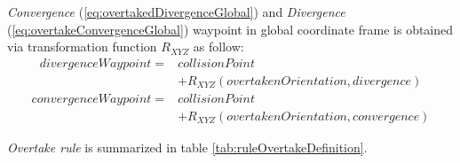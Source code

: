 \emph{Convergence} (\ref{eq:overtakedDivergenceGlobal}) and \emph{Divergence} (\ref{eq:overtakeConvergenceGlobal}) waypoint in global coordinate frame is obtained via transformation function $R_{XYZ}$ as follow:
\begin{equation}\label{eq:overtakedDivergenceGlobal}
    \begin{split}
        divergenceWaypoint = & collisionPoint \\ &+ R_{XYZ}(overtakenOrientation,divergence)    
    \end{split}
\end{equation}
\begin{equation}\label{eq:overtakeConvergenceGlobal}
    \begin{split}
        convergenceWaypoint =  & collisionPoint \\ &+ R_{XYZ}(overtakenOrientation,convergence) 
    \end{split}
\end{equation}

\noindent \emph{Overtake rule} is summarized in table \ref{tab:ruleOvertakeDefinition}.    
        
